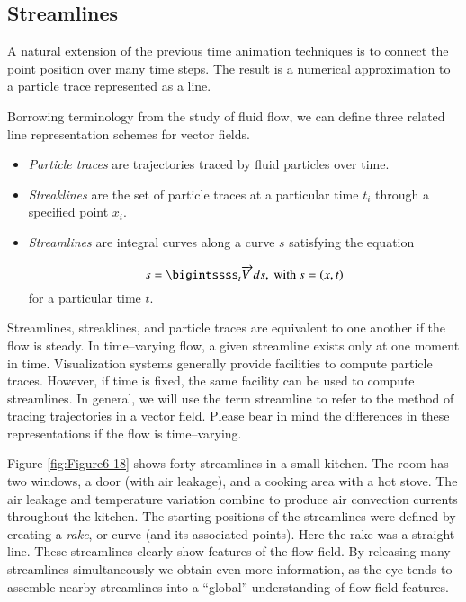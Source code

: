 \subsection{Streamlines}

A natural extension of the previous time animation techniques is to connect the point position over many time steps. The result is a numerical approximation to a particle trace represented as a line.

Borrowing terminology from the study of fluid flow, we can define three related line representation schemes for vector fields.

\begin{itemize}

\item \emph{Particle traces} are trajectories traced by fluid particles over time.

\item \emph{Streaklines} are the set of particle traces at a particular time $t_i$ through a specified point $x_i$.

\item \emph{Streamlines} are integral curves along a curve $s$ satisfying the equation

\begin{equation}\label{eq:6.5}
s = \bigintssss_{t}\overrightarrow{V\ }ds, \ \text{with}\ s = (x,t)
\end{equation}
for a particular time $t$.
\end{itemize}

Streamlines, streaklines, and particle traces are equivalent to one another if the flow is steady. In time--varying flow, a given streamline exists only at one moment in time. Visualization systems generally provide facilities to compute particle traces. However, if time is fixed, the same facility can be used to compute streamlines. In general, we will use the term streamline to refer to the method of tracing trajectories in a vector field. Please bear in mind the differences in these representations if the flow is time--varying.

Figure \ref{fig:Figure6-18} shows forty streamlines in a small kitchen. The room has two windows, a door (with air leakage), and a cooking area with a hot stove. The air leakage and temperature variation combine to produce air convection currents throughout the kitchen. The starting positions of the streamlines were defined by creating a \emph{rake}, or curve (and its associated points). Here the rake was a straight line. These streamlines clearly show features of the flow field. By releasing many streamlines simultaneously we obtain even more information, as the eye tends to assemble nearby streamlines into a ``global'' understanding of flow field features.

